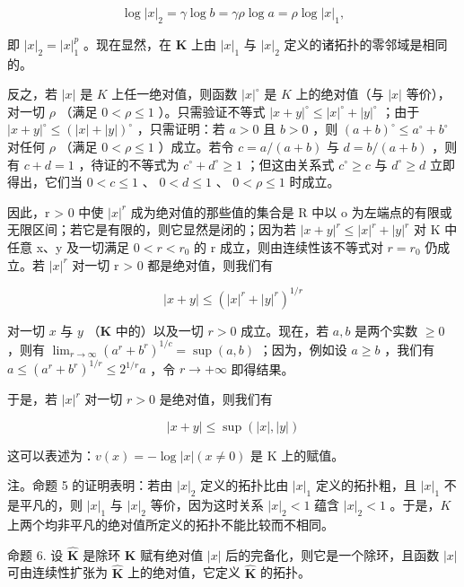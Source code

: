\[
\log | x | _ {2} = \gamma \log b = \gamma \rho \log a = \rho \log | x | _ {1},
\]

即 \(|x|_2 = |x|_1^p\) 。现在显然，在 \(\mathbf{K}\) 上由 \(|x|_1\) 与 \(|x|_2\) 定义的诸拓扑的零邻域是相同的。

反之，若 \(|x|\) 是 \(K\) 上任一绝对值，则函数 \(|x|^{\circ}\) 是 \(K\) 上的绝对值（与 \(|x|\) 等价），对一切 \(\rho\) （满足 \(0 < \rho \leqslant 1\) ）。只需验证不等式 \(|x + y|^{\circ} \leqslant |x|^{\circ} + |y|^{\circ}\) ；由于 \(|x + y|^{\circ} \leqslant (|x| + |y|)^{\circ}\) ，只需证明：若 \(a > 0\) 且 \(b > 0\) ，则 \((a + b)^{\circ} \leqslant a^{\circ} + b^{\circ}\) 对任何 \(\rho\) （满足 \(0 < \rho \leqslant 1\) ）成立。若令 \(c = a / (a + b)\) 与 \(d = b / (a + b)\) ，则有 \(c + d = 1\) ，待证的不等式为 \(c^{\circ} + d^{\circ} \geqslant 1\) ；但这由关系式 \(c^{\circ} \geqslant c\) 与 \(d^{\circ} \geqslant d\) 立即得出，它们当 \(0 < c \leqslant 1\) 、 \(0 < d \leqslant 1\) 、 \(0 < \rho \leqslant 1\) 时成立。

因此，r \textgreater{} 0 中使 \(|x|^{r}\) 成为绝对值的那些值的集合是 R 中以 o 为左端点的有限或无限区间；若它是有限的，则它显然是闭的；因为若 \(|x + y|^{r} \leqslant |x|^{r} + |y|^{r}\) 对 K 中任意 x、y 及一切满足 \(0 < r < r_{0}\) 的 r 成立，则由连续性该不等式对 \(r = r_{0}\) 仍成立。若 \(|x|^{r}\) 对一切 r \textgreater{} 0 都是绝对值，则我们有

\[
| x + y | \leqslant (| x | ^ {r} + | y | ^ {r}) ^ {1 / r}
\]

对一切 \(x\) 与 \(y\) （\(\mathbf{K}\) 中的）以及一切 \(r > 0\) 成立。现在，若 \(a, b\) 是两个实数 \(\geqslant 0\) ，则有 \(\lim_{r \to \infty} (a^r + b^r)^{1/c} = \sup (a, b)\) ；因为，例如设 \(a \geqslant b\) ，我们有 \(a \leqslant (a^r + b^r)^{1/r} \leqslant 2^{1/r} a\) ，令 \(r \to +\infty\) 即得结果。

于是，若 \(|x|^r\) 对一切 \(r > 0\) 是绝对值，则我们有

\[
| x + y | \leqslant \sup (| x |, | y |)
\]

这可以表述为：\(v(x) = -\log |x| (x \neq 0)\) 是 K 上的赋值。

注。命题 5 的证明表明：若由 \(|x|_2\) 定义的拓扑比由 \(|x|_1\) 定义的拓扑粗，且 \(|x|_1\) 不是平凡的，则 \(|x|_1\) 与 \(|x|_2\) 等价，因为这时关系 \(|x|_2 < 1\) 蕴含 \(|x|_2 < 1\) 。于是，\(K\) 上两个均非平凡的绝对值所定义的拓扑不能比较而不相同。

命题 6. 设 \(\hat{\mathbf{K}}\) 是除环 \(\mathbf{K}\) 赋有绝对值 \(|x|\) 后的完备化，则它是一个除环，且函数 \(|x|\) 可由连续性扩张为 \(\hat{\mathbf{K}}\) 上的绝对值，它定义 \(\hat{\mathbf{K}}\) 的拓扑。

